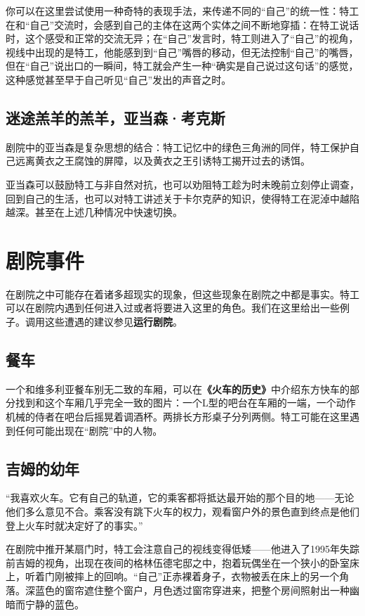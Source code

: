 你可以在这里尝试使用一种奇特的表现手法，来传递不同的“自己”的统一性：特工在和“自己”交流时，会感到自己的主体在这两个实体之间不断地穿插：在特工说话时，这个感受和正常的交流无异；在“自己”发言时，特工则进入了“自己”的视角，视线中出现的是特工，他能感到到“自己”嘴唇的移动，但无法控制“自己”的嘴唇，但在“自己”说出口的一瞬间，特工就会产生一种“确实是自己说过这句话”的感觉，这种感觉甚至早于自己听见“自己”发出的声音之时。

\subsection{迷途羔羊的羔羊，亚当森·考克斯}

剧院中的亚当森是复杂思想的结合：特工记忆中的绿色三角洲的同伴，特工保护自己远离黄衣之王腐蚀的屏障，以及黄衣之王引诱特工揭开过去的诱饵。

亚当森可以鼓励特工与非自然对抗，也可以劝阻特工趁为时未晚前立刻停止调查，回到自己的生活，也可以对特工讲述关于卡尔克萨的知识，使得特工在泥淖中越陷越深。甚至在上述几种情况中快速切换。

\section{剧院事件}
在剧院之中可能存在着诸多超现实的现象，但这些现象在剧院之中都是事实。特工可以在剧院内遇到任何进入过或者将要进入这里的角色。我们在这里给出一些例子。调用这些遭遇的建议参见\textbf{运行剧院}。

\subsection{餐车}
一个和维多利亚餐车别无二致的车厢，可以在\textbf{《火车的历史》}中介绍东方快车的部分找到和这个车厢几乎完全一致的图片：一个L型的吧台在车厢的一端，一个动作机械的侍者在吧台后摇晃着调酒杯。两排长方形桌子分列两侧。特工可能在这里遇到任何可能出现在“剧院”中的人物。

\subsection{吉姆的幼年}
“我喜欢火车。它有自己的轨道，它的乘客都将抵达最开始的那个目的地——无论他们多么意见不合。乘客没有跳下火车的权力，观看窗户外的景色直到终点是他们登上火车时就决定好了的事实。”

在剧院中推开某扇门时，特工会注意自己的视线变得低矮——他进入了1995年失踪前吉姆的视角，出现在夜间的格林伍德宅邸之中，抱着玩偶坐在一个狭小的卧室床上，听着门刚被摔上的回响。“自己”正赤裸着身子，衣物被丢在床上的另一个角落。深蓝色的窗帘遮住整个窗户，月色透过窗帘穿进来，把整个房间照射出一种幽暗而宁静的蓝色。

